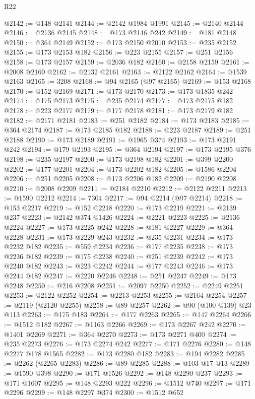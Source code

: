 \begin{lexlean}{R22}
\begin{coremodule}
@2142 := @148 @2141
@2144 := @2142 @1984 @1991
@2145 := @2140 @2144
@2146 := @2136 @2145
@2148 := @173 @2146 @242
@2149 := @181 @2148
@2150 := @364 @2149
@2152 := @173 @2150 @2010
@2153 := @235 @2152
@2155 := @173 @2153 @182
@2156 := @223 @2155
@2157 := @251 @2156
@2158 := @173 @2157
@2159 := @2036 @182
@2160 := @2158 @2159
@2161 := @2008 @2160
@2162 := @2132 @2161
@2163 := @2122 @2162
@2164 := @1539 @2163
@2165 := 3208
@2168 := @94 @2165 (@97 @2165)
@2169 := @153 @2168
@2170 := @152 @2169
@2171 := @173 @2170
@2173 := @173 @1835 @242
@2174 := @175 @2173
@2175 := @235 @2174
@2177 := @173 @2175 @182
@2178 := @223 @2177
@2179 := @177 @2178
@2181 := @173 @2179 @182
@2182 := @2171 @2181
@2183 := @251 @2182
@2184 := @173 @2183
@2185 := @364 @2174
@2187 := @173 @2185 @182
@2188 := @223 @2187
@2189 := @251 @2188
@2190 := @173 @2189
@2191 := @1965 @374
@2193 := @173 @2191 @242
@2194 := @179 @2193
@2195 := @364 @2194
@2197 := @173 @2195 @376
@2198 := @235 @2197
@2200 := @173 @2198 @182
@2201 := @399 @2200
@2202 := @177 @2201
@2204 := @173 @2202 @182
@2205 := @1586 @2204
@2206 := @251 @2205
@2208 := @173 @2206 @182
@2209 := @2190 @2208
@2210 := @2008 @2209
@2211 := @2184 @2210
@2212 := @2122 @2211
@2213 := @1590 @2212
@2214 := 7304
@2217 := @94 @2214 (@97 @2214)
@2218 := @153 @2217
@2219 := @152 @2218
@2220 := @173 @2219
@2221 := @2139 @237
@2223 := @2142 @374 @1426
@2224 := @2221 @2223
@2225 := @2136 @2224
@2227 := @173 @2225 @242
@2228 := @181 @2227
@2229 := @364 @2228
@2231 := @173 @2229 @243
@2232 := @235 @2231
@2234 := @173 @2232 @182
@2235 := @559 @2234
@2236 := @177 @2235
@2238 := @173 @2236 @182
@2239 := @175 @2238
@2240 := @251 @2239
@2242 := @173 @2240 @182
@2243 := @223 @2242
@2244 := @177 @2243
@2246 := @173 @2244 @182
@2247 := @2220 @2246
@2248 := @251 @2247
@2249 := @173 @2248
@2250 := @216 @2208
@2251 := @2097 @2250
@2252 := @2249 @2251
@2253 := @2122 @2252
@2254 := @2213 @2253
@2255 := @2164 @2254
@2257 := @2119 (@2120 @2255)
@2258 := @89 @2257
@2262 := @90 (@100 @139) @23 @113
@2263 := @175 @183
@2264 := @177 @2263
@2265 := @147 @2264
@2266 := @1512 @182
@2267 := @1163 @2266
@2269 := @173 @2267 @242
@2270 := @1401 @2269
@2271 := @364 @2270
@2273 := @173 @2271 @400
@2274 := @235 @2273
@2276 := @173 @2274 @242
@2277 := @171 @2276
@2280 := @148 @2277 @178 @1565
@2282 := @173 @2280 @182
@2283 := @194 @2282
@2285 := @2262 (@2265 @2283)
@2286 := @89 @2285
@2288 := @103 @17 @13
@2289 := @1590 @398
@2290 := @171 @1526
@2292 := @148 @2290 @237
@2293 := @171 @1607
@2295 := @148 @2293 @222
@2296 := @1512 @740
@2297 := @171 @2296
@2299 := @148 @2297 @374
@2300 := @1512 @652

\end{coremodule}
\end{lexlean}
